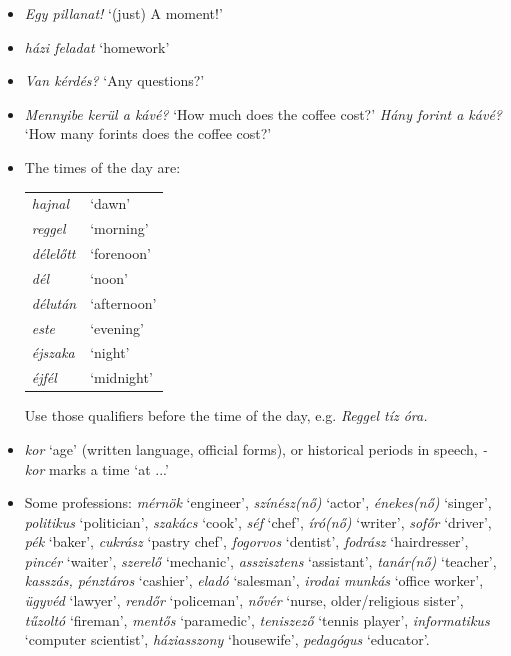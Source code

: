 \documentclass[a4paper,11pt]{article}
\begin{document}
\begin{itemize}

  \item \emph{Egy pillanat!} `(just) A moment!'

  \item \emph{házi feladat} `homework'

  \item \emph{Van kérdés?} `Any questions?'

  \item \emph{Mennyibe kerül a kávé?} `How much does the coffee cost?'
    \emph{Hány forint a kávé?} `How many forints does the coffee
    cost?'

    \item The times of the day are:
    \begin{center}
      \begin{tabular}{>{\itshape}ll}
        hajnal   & `dawn' \\
        reggel   & `morning' \\
        délelőtt & `forenoon' \\
        dél      & `noon' \\
        délután  & `afternoon' \\
        este     & `evening' \\
        éjszaka  & `night' \\
        éjfél    & `midnight'
      \end{tabular}
    \end{center}
    Use those qualifiers before the time of the day, e.g. \emph{Reggel
    tíz óra.}

  \item \emph{kor} `age' (written language, official forms), or
    historical periods in speech, \emph{-kor} marks a time `at ...'

  \item Some professions: \emph{mérnök} `engineer', \emph{színész(nő)}
    `actor', \emph{énekes(nő)} `singer', \emph{politikus}
    `politician', \emph{szakács} `cook', \emph{séf} `chef',
    \emph{író(nő)} `writer', \emph{sofőr} `driver', \emph{pék}
    `baker', \emph{cukrász} `pastry chef', \emph{fogorvos} `dentist',
    \emph{fodrász} `hairdresser', \emph{pincér} `waiter',
    \emph{szerelő} `mechanic', \emph{asszisztens} `assistant',
    \emph{tanár(nő)} `teacher', \emph{kasszás, pénztáros} `cashier',
    \emph{eladó} `salesman', \emph{irodai munkás} `office worker',
    \emph{ügyvéd} `lawyer', \emph{rendőr} `policeman', \emph{nővér}
    `nurse, older/religious sister', \emph{tűzoltó} `fireman',
    \emph{mentős} `paramedic', \emph{tenisz\-ező} `tennis player',
    \emph{informatikus} `computer scientist', \emph{háziasszony}
    `housewife', \emph{pedagógus} `educator'.


\end{itemize}
\end{document}
